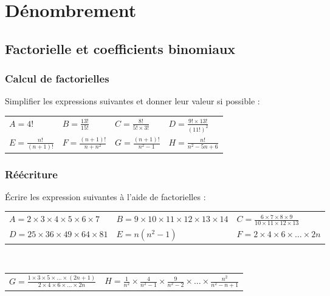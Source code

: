 \documentclass[oneside,12pt]{book}          %
\begin{document}

\chapter{Dénombrement}
\newpage

\section{Factorielle et coefficients binomiaux}

\subsection{Calcul de factorielles}
Simplifier les expressions suivantes et donner leur valeur si possible :

\begin{tabular}{p{}p{}p{}p{}}
    $A=4!$ & $B=\frac{13!}{15!}$ & $C=\frac{8!}{5!\times3!}$ & $D=\frac{9!\times13!}{(11!)^2}$\\
    $E=\frac{n!}{(n+1)!}$ & $F=\frac{(n+1)!}{n+n^2}$ & $G=\frac{(n+1)!}{n^2-1}$ & $H=\frac{n!}{n^2-5n+6}$
\end{tabular}



\subsection{Réécriture}
Écrire les expression suivantes à l'aide de factorielles :

\begin{tabular}{p{}p{}p{}}
    $A=2\times3\times4\times5\times6\times7$ & $B=9\times10\times11\times12\times13\times14$ & $C=\frac{6\times7\times8\times9}{10\times11\times12\times13}$\\
    $D=25\times36\times49\times64\times81$ & $E=n(n^2-1)$ & $F=2\times4\times6\times\ldots\times2n$\\
\end{tabular}\\
\begin{tabular}{p{}p{}}
    $G=\frac{1\times3\times5\times\ldots\times(2n+1)}{2\times4\times6\times\ldots\times2n}$ & $H=\frac{1}{n^2}\times\frac{4}{n^2-1}\times\frac{9}{n^2-2}\times\ldots\times\frac{n^2}{n^2-n+1}$    
\end{tabular}
\end{document}
